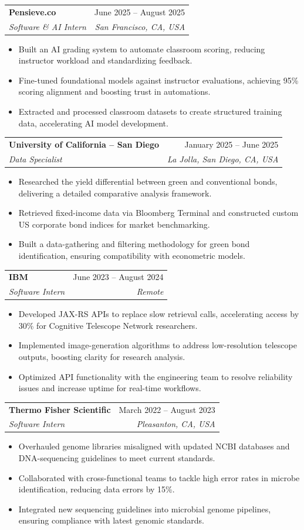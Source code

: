 \documentclass[letterpaper,11pt]{article}
\makeatletter
\newcommand{\resumeItem}[1]{
  \item\small{
    {#1 \vspace{-4pt}}
  }
}
\newcommand{\resumeSubheading}[4]{
  \vspace{0pt}\item
    \begin{tabular*}{0.97\textwidth}[t]{l@{\extracolsep{\fill}}r}
      \textbf{#1} & #2 \\[-2pt]
      \textit{\small#3} & \textit{\small #4} \\
    \end{tabular*}\vspace{-9pt}
}
\newcommand{\resumeItemListStart}{\begin{itemize}}
\newcommand{\resumeItemListEnd}{\end{itemize}\vspace{-4pt}}
\makeatother
\begin{document}
    \resumeSubheading
      {Pensieve.co}{June 2025 -- August 2025}
      {Software \& AI Intern}{San Francisco, CA, USA}
      \resumeItemListStart
        \resumeItem{Built an AI grading system to automate classroom scoring, reducing instructor workload and standardizing feedback.}
        \resumeItem{Fine-tuned foundational models against instructor evaluations, achieving 95\% scoring alignment and boosting trust in automations.}
        \resumeItem{Extracted and processed classroom datasets to create structured training data, accelerating AI model development.}
      \resumeItemListEnd

    \resumeSubheading
      {University of California -- San Diego}{January 2025 -- June 2025}
      {Data Specialist}{La Jolla, San Diego, CA, USA}
      \resumeItemListStart
        \resumeItem{Researched the yield differential between green and conventional bonds, delivering a detailed comparative analysis framework.}
        \resumeItem{Retrieved fixed-income data via Bloomberg Terminal and constructed custom US corporate bond indices for market benchmarking.}
        \resumeItem{Built a data-gathering and filtering methodology for green bond identification, ensuring compatibility with econometric models.}
      \resumeItemListEnd

    \resumeSubheading
      {IBM}{June 2023 -- August 2024}
      {Software Intern}{Remote}
      \resumeItemListStart
        \resumeItem{Developed JAX-RS APIs to replace slow retrieval calls, accelerating access by 30\% for Cognitive Telescope Network researchers.}
        \resumeItem{Implemented image-generation algorithms to address low-resolution telescope outputs, boosting clarity for research analysis.}
        \resumeItem{Optimized API functionality with the engineering team to resolve reliability issues and increase uptime for real-time workflows.}
      \resumeItemListEnd

    \resumeSubheading
      {Thermo Fisher Scientific}{March 2022 -- August 2023}
      {Software Intern}{Pleasanton, CA, USA}
      \resumeItemListStart
        \resumeItem{Overhauled genome libraries misaligned with updated NCBI databases and DNA-sequencing guidelines to meet current standards.}
        \resumeItem{Collaborated with cross-functional teams to tackle high error rates in microbe identification, reducing data errors by 15\%.}
        \resumeItem{Integrated new sequencing guidelines into microbial genome pipelines, ensuring compliance with latest genomic standards.}
      \resumeItemListEnd
\end{document}
